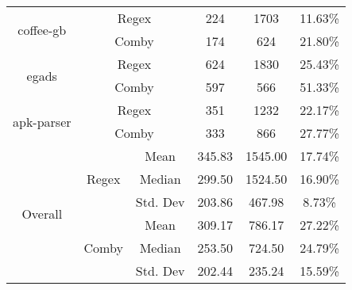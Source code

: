 \documentclass[sigconf,review, anonymous]{acmart}
\begin{document}
{\begin{table}[hbtp]
{\begin{tabular}{|c|c|c|c|c|c|}
\multirow{2}{*}{coffee-gb} & \multicolumn{2}{c|}{Regex} & 224 & 1703 & 11.63\% \\\cline{2-6}
    & \multicolumn{2}{c|}{Comby} & 174 & 624 & 21.80\% \\ \hline
\multirow{2}{*}{egads} & \multicolumn{2}{c|}{Regex} & 624 & 1830 & 25.43\% \\\cline{2-6}
    & \multicolumn{2}{c|}{Comby} & 597 & 566 & 51.33\% \\ \hline
\multirow{2}{*}{apk-parser} & \multicolumn{2}{c|}{Regex} & 351 & 1232 & 22.17\% \\\cline{2-6}
    & \multicolumn{2}{c|}{Comby} & 333 & 866 & 27.77\% \\ \hline

\multirow{6}{*}{Overall} & \multirow{3}{*}{Regex} & Mean & 345.83 & 1545.00  & 17.74\%\\\cline{3-6}
    &   &  Median & 299.50 & 1524.50 & 16.90\%  \\\cline{3-6}
    &   &  Std. Dev & 203.86 & 467.98 & 8.73\%  \\\cline{2-6}

 & \multirow{3}{*}{Comby} & Mean & 309.17 & 786.17 & 27.22\% \\\cline{3-6}
    &   &  Median & 253.50 & 724.50 & 24.79\%  \\\cline{3-6}
    &   &  Std. Dev & 202.44 & 235.24  & 15.59\%  \\\hline


\end{tabular}

}
\end{table}


\begin{table}[hbtp]
\centering
\caption{Python (Regex vs. Comby)}
\label{tab:table_python1}
\end{table}}
\end{document}
